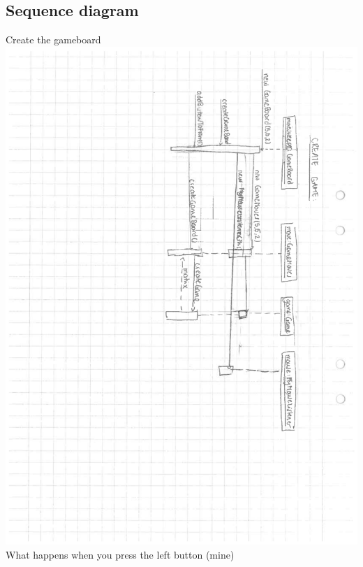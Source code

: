 \documentclass[12pt,twoside,a4paper]{article}
\begin{document}
\subsection{Sequence diagram}
Create the gameboard \\
\includegraphics[scale = 0.7, angle = 90]{seq3.pdf} \\
\newpage
What happens when you press the left button (mine) \\
\end{document}
